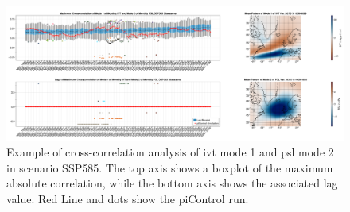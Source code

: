 \begin{figure}
    \centering
    \includegraphics[width=\textwidth]{figures/crosscorrelation_boxplot_ivt_psl_modes12_ssp585_50seasons.png}
    \caption[Cross-Correlation Analysis Example]{Example of cross-correlation analysis of \ac{ivt} mode 1 and \ac{psl} mode 2 in scenario SSP585. The top axis shows a boxplot of the maximum absolute correlation, while the bottom axis shows the associated lag value. Red Line and dots show the piControl run.}
    \label{fig:crosscorrelation example}
\end{figure}

%
%     
%


